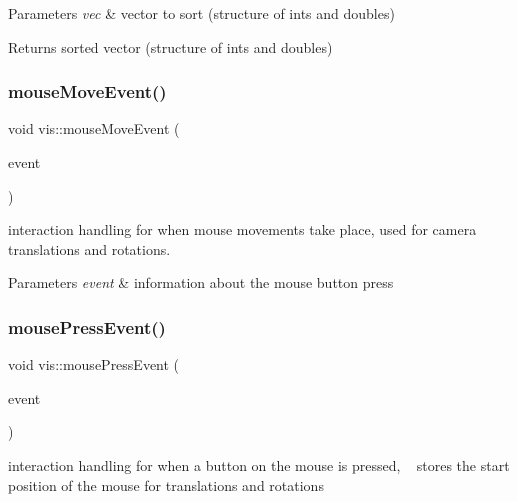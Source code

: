 \begin{DoxyParams}{Parameters}
{\em vec} & vector to sort (structure of ints and doubles) \\
\hline
\end{DoxyParams}
\begin{DoxyReturn}{Returns}
sorted vector (structure of ints and doubles) 
\end{DoxyReturn}
\mbox{\label{classvis_a7c623384a8ab883c83256b988d7df536}} 
\subsubsection{\texorpdfstring{mouse\+Move\+Event()}{mouseMoveEvent()}}
{\footnotesize\ttfamily void vis\+::mouse\+Move\+Event (\begin{DoxyParamCaption}\item[{Q\+Mouse\+Event $\ast$}]{event }\end{DoxyParamCaption})\hspace{0.3cm}{\ttfamily [protected]}}

interaction handling for when mouse movements take place, used for camera translations and rotations.


\begin{DoxyParams}{Parameters}
{\em event} & information about the mouse button press \\
\hline
\end{DoxyParams}
\mbox{\label{classvis_aee3d8312e44262956a94ccc10b2469f7}} 
\subsubsection{\texorpdfstring{mouse\+Press\+Event()}{mousePressEvent()}}
{\footnotesize\ttfamily void vis\+::mouse\+Press\+Event (\begin{DoxyParamCaption}\item[{Q\+Mouse\+Event $\ast$}]{event }\end{DoxyParamCaption})\hspace{0.3cm}{\ttfamily [protected]}}

interaction handling for when a button on the mouse is pressed, ~\newline
stores the start position of the mouse for translations and rotations


